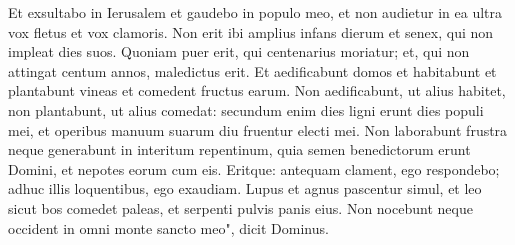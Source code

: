 \begin{biblechapter}
\verse Et exsultabo in Ierusalem et gaudebo in populo meo, et non audietur in ea ultra vox fletus et vox clamoris. 
\verse Non erit ibi amplius infans dierum et senex, qui non impleat dies suos. Quoniam puer erit, qui centenarius moriatur; et, qui non attingat centum annos, maledictus erit. 
\verse Et aedificabunt domos et habitabunt et plantabunt vineas et comedent fructus earum. 
\verse Non aedificabunt, ut alius habitet, non plantabunt, ut alius comedat: secundum enim dies ligni erunt dies populi mei, et operibus manuum suarum diu fruentur electi mei. 
\verse Non laborabunt frustra neque generabunt in interitum repentinum, quia semen benedictorum erunt Domini, et nepotes eorum cum eis. 
\verse Eritque: antequam clament, ego respondebo; adhuc illis loquentibus, ego exaudiam. 
\verse Lupus et agnus pascentur simul, et leo sicut bos comedet paleas, et serpenti pulvis panis eius. Non nocebunt neque occident in omni monte sancto meo", dicit Dominus. 
\end{biblechapter}

